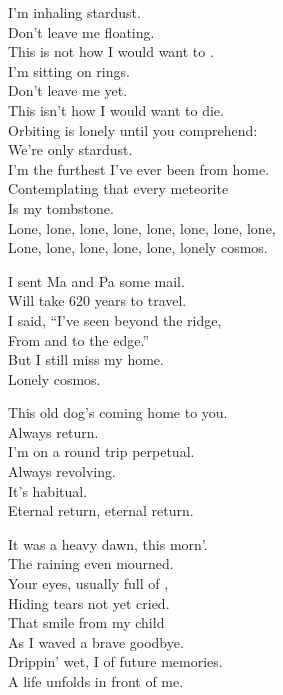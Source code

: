 
I'm inhaling stardust. \\
Don't leave me floating. \\
This is not how I would want to . \\
I'm sitting on  rings. \\

Don't leave me yet. \\
This isn't how I would want to die. \\
Orbiting is lonely until you comprehend: \\
We're only stardust. \\
I'm the furthest I've ever been from home. \\
Contemplating that every meteorite \\
Is my tombstone. \\

Lone, lone, lone, lone, lone, lone, lone, lone, \\
Lone, lone, lone, lone, lone, lonely cosmos. \\


I sent Ma and Pa some mail. \\
Will take 620 years to travel. \\
I said, ``I've seen beyond the ridge, \\
From  and to the edge.'' \\
But I still miss my home. \\
Lonely cosmos. \\





This old dog's coming home to you. \\
Always return. \\
I'm on a round trip perpetual. \\
Always revolving. \\
It's habitual. \\
Eternal return, eternal return. \\


It was a heavy dawn, this morn'. \\
The raining  even mourned. \\
Your eyes, usually full of , \\
Hiding tears not yet cried. \\
That smile from my child \\
As I waved a brave goodbye. \\
Drippin' wet, I  of future memories. \\
A life unfolds in front of me. \\

